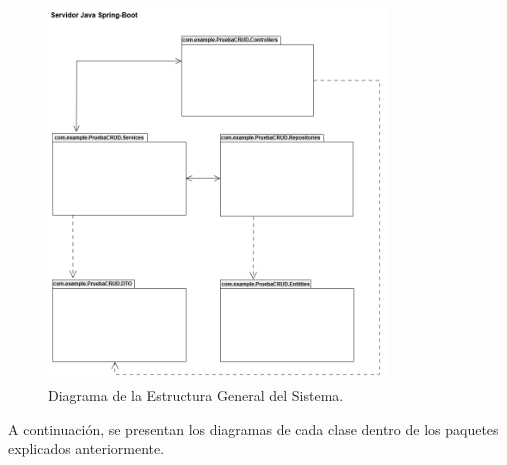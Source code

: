 \begin{figure}[htbp!]
	\begin{center}
		\includegraphics[width=0.8\textwidth]{Clases/DCG.png}
		\caption{Diagrama de la Estructura General del Sistema.}
		\label{fig:DCG}
	\end{center}
\end{figure}

A continuación, se presentan los diagramas de cada clase dentro de los paquetes explicados anteriormente.

\newpage

